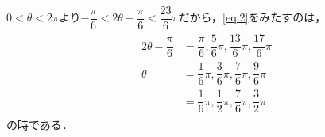\documentclass[../../main.tex]{subfiles}
\begin{document}
$0<\theta<2\pi$より$-\dfrac{\pi}{6}<2\theta-\dfrac{\pi}{6}<\dfrac{23}{6}\pi$だから，\cref{eq:2}をみたすのは，
\begin{align}
  \begin{split}
    2\theta-\dfrac{\pi}{6}&=\dfrac{\pi}{6},\dfrac{5}{6}\pi,\dfrac{13}{6}\pi,\dfrac{17}{6}\pi \\
    \theta&=\dfrac{1}{6}\pi,\dfrac{3}{6}\pi,\dfrac{7}{6}\pi,\dfrac{9}{6}\pi \\
    &=\dfrac{1}{6}\pi,\dfrac{1}{2}\pi,\dfrac{7}{6}\pi,\dfrac{3}{2}\pi
  \end{split}
\end{align}
の時である．

\newpage
\end{document}
